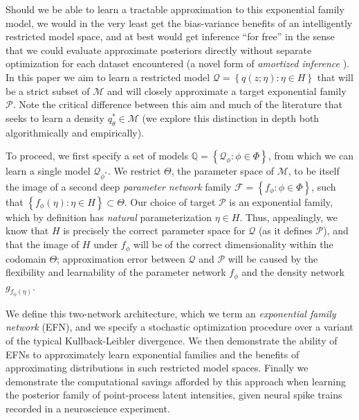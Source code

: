 \documentclass[twoside]{article}
\begin{document}
 Should we be able to learn a tractable approximation to this exponential family model, we would in the very least get the bias-variance benefits of an intelligently restricted model space, and at best would get inference ``for free'' in the sense that we could evaluate approximate posteriors directly without separate optimization for each dataset encountered (a novel form of \emph{amortized inference} \citep{gershman2014amortized,Kingma:2013aa,rezende2014stochastic,stuhlmuller2013learning}).  
 In this paper we aim to learn a restricted model $\mathcal{Q} = \left\{ q(z; \eta): \eta \in H \right\}$ that will be a strict subset of $\mathcal{M}$ and will closely approximate a target exponential family $\mathcal{P}$.  
 Note the critical difference between this aim and much of the literature that seeks to learn a density $q_{\theta}^* \in \mathcal{M}$ (we explore this distinction in depth both algorithmically and empirically).  
 
To proceed, we first specify a set of models $\mathbb{Q} = \left\{ \mathcal{Q}_\phi : \phi \in \Phi \right\}$, from which we can learn a single model $\mathcal{Q}_{\phi^*}$.  We restrict $\Theta$, the parameter space of $\mathcal{M}$, to be itself the image of a second deep \emph{parameter network} family $\mathcal{F} = \left\{f_\phi : \phi \in \Phi\right\}$, such that $\left\{ f_\phi(\eta) : \eta \in H \right\} \subset \Theta$.
Our choice of target $\mathcal{P}$ is an exponential family,  which by definition has \emph{natural} parameterization $\eta \in H$.   Thus, appealingly, we know that $H$ is precisely the correct parameter space for $\mathcal{Q}$ (as it defines $\mathcal{P}$), and that the image of $H$ under $f_\phi$ will be of the correct dimensionality within the codomain $\Theta$; approximation error between $\mathcal{Q}$ and $\mathcal{P}$ will be caused by the flexibility and learnability of the parameter network $f_\phi$ and the density network $g_{f_{\phi}(\eta)}$.  

We define this two-network architecture, which we term an \emph{exponential family network} (EFN), and we specify a stochastic optimization procedure over a variant of the typical Kullback-Leibler divergence.  We then demonstrate the ability of EFNs to approximately learn exponential families and the benefits of approximating distributions in such restricted model spaces.  Finally we demonstrate the computational savings afforded by this approach when learning the posterior family of point-process latent intensities, given neural spike trains recorded in a neuroscience experiment.
\end{document}
